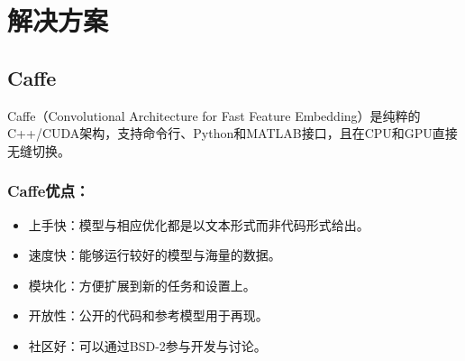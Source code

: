 \section{解决方案}
\subsection{Caffe}
Caffe（Convolutional Architecture for Fast Feature Embedding）是纯粹的C++/CUDA架构，支持命令行、Python和MATLAB接口，且在CPU和GPU直接无缝切换。
\subsubsection{Caffe优点：}
\begin{itemize}
\item 上手快：模型与相应优化都是以文本形式而非代码形式给出。
\item 速度快：能够运行较好的模型与海量的数据。
\item 模块化：方便扩展到新的任务和设置上。
\item 开放性：公开的代码和参考模型用于再现。
\item 社区好：可以通过BSD-2参与开发与讨论。
\end{itemize}





